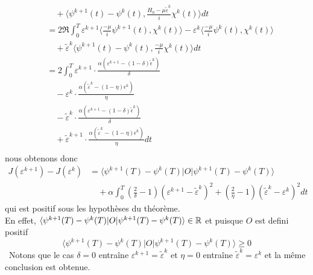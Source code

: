 \begin{ proof }
\begin{align*}
&\quad + \langle \psi^{k+1}(t)-\psi^{k}(t), \frac{H_0-\mu \tilde{\varepsilon}^k}{i}\chi^{k}(t) \rangle dt\\
&= 2\Re \int_{0}^{T} \varepsilon^{k+1} \langle \frac{-\mu}{i}\psi^{k+1}(t), \chi^{k}(t)\rangle- \varepsilon^{k} \langle \frac{-\mu}{i}\psi^{k}(t), \chi^{k}(t)\rangle\\
&\quad + \tilde{\varepsilon}^{k} \langle \psi^{k+1}(t)-\psi^{k}(t), \frac{-\mu}{i} \chi^{k}(t)\rangle dt\\
&= 2 \int_{0}^{T} \varepsilon^{k+1} \cdot \frac{\alpha (\varepsilon^{k+1}-(1-\delta)\tilde{\epsilon}^k)}{\delta}\\
&\quad - \varepsilon^{k} \cdot \frac{\alpha (\tilde{\varepsilon}^{k}-(1-\eta)\epsilon^k)}{\eta}\\
&\quad - \tilde{\varepsilon}^{k} \cdot \frac{\alpha (\varepsilon^{k+1}-(1-\delta)\tilde{\epsilon}^k)}{\delta}\\
&\quad + \tilde{\varepsilon}^{k+1} \cdot \frac{\alpha (\tilde{\varepsilon}^{k}-(1-\eta)\epsilon^k)}{\eta}dt\\
\end{align*}
nous obtenons donc
\begin{align*}
J(\varepsilon^{k+1})-J(\varepsilon^{k}) &= \langle \psi^{k+1}(T) - \psi^{k}(T)|O| \psi^{k+1}(T) - \psi^{k}(T) \rangle\\
& \quad + \alpha \int_{0}^{T} (\frac{2}{\delta}-1)(\varepsilon^{k+1}-\tilde{\varepsilon}^k)^2 + (\frac{2}{\eta}-1)(\tilde{\varepsilon}^k-\varepsilon^{k})^2 dt
\end{align*}
qui est positif sous les hypothèses du théorème.\\ En effet, $\langle \psi^{k+1}(T)-\psi^{k}(T)|O| \psi^{k+1}(T)-\psi^{k}(T)\rangle \in \mathbb R$ et puisque $O$ est defini positif 
$$
\langle \psi^{k+1}(T)-\psi^{k}(T)|O| \psi^{k+1}(T)-\psi^{k}(T)\rangle \geq 0
$$\
Notons que le cas $\delta=0$ entraîne $\varepsilon^{k+1}=\tilde{\varepsilon}^k$ et $\eta=0$ entraîne $\tilde{\varepsilon}^{k}=\varepsilon^k$ et la même conclusion est obtenue.
\end{ proof }
